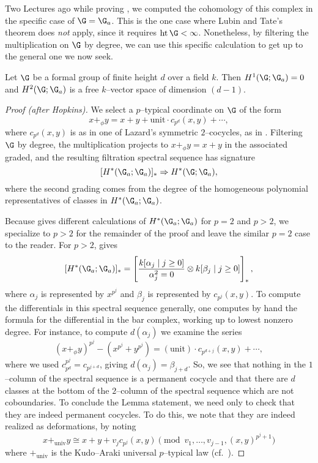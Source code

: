 Two Lectures ago while proving , we computed the cohomology of this complex in the specific case of $\G = \G_a$.  This is the one case where Lubin and Tate's theorem does \emph{not} apply, since it requires $\height \G < \infty$.  Nonetheless, by filtering the multiplication on $\G$ by degree, we can use this specific calculation to get up to the general one we now seek.

\begin{lemma}\label{CalculationOfLTTangentSpace}
Let $\G$ be a formal group of finite height $d$ over a field $k$.  Then $H^1(\G; \G_a) = 0$ and $H^2(\G; \G_a)$ is a free $k$--vector space of dimension $(d - 1)$.
\end{lemma}
\begin{proof}[Proof (after Hopkins)]
We select a $p$--typical coordinate on $\G$ of the form \[x +_\phi y = x + y + \mathrm{unit} \cdot c_{p^d}(x, y) + \cdots,\] where $c_{p^d}(x, y)$ is as in one of Lazard's symmetric $2$--cocycles, as in .  Filtering $\G$ by degree, the multiplication projects to $x +_\phi y = x + y$ in the associated graded, and the resulting filtration spectral sequence has signature \[[H^*(\G_a; \G_a)]_* \Rightarrow H^*(\G; \G_a),\] where the second grading comes from the degree of the homogeneous polynomial representatives of classes in $H^*(\G_a; \G_a)$.

Because  gives different calculations of $H^*(\G_a; \G_a)$ for $p = 2$ and $p > 2$, we specialize to $p > 2$ for the remainder of the proof and leave the similar $p = 2$ case to the reader.  For $p > 2$,  gives \[[H^*(\G_a; \G_a)]_* = \left[\frac{k[\alpha_j \mid j \ge 0]}{\alpha_j^2 = 0} \otimes k[\beta_j \mid j \ge 0]\right]_*,\] where $\alpha_j$ is represented by $x^{p^j}$ and $\beta_j$ is represented by $c_{p^j}(x, y)$.  To compute the differentials in this spectral sequence generally, one computes by hand the formula for the differential in the bar complex, working up to lowest nonzero degree.  For instance, to compute $d(\alpha_j)$ we examine the series \[(x +_\phi y)^{p^j} - (x^{p^j} + y^{p^j}) = (\text{unit}) \cdot c_{p^{d + j}}(x, y) + \cdots,\] where we used $c_{p^d}^{p^j} = c_{p^{j+d}}$, giving $d(\alpha_j) = \beta_{j+d}$.  So, we see that nothing in the $1$--column of the spectral sequence is a permanent cocycle and that there are $d$ classes at the bottom of the $2$--column of the spectral sequence which are not coboundaries.  To conclude the Lemma statement, we need only to check that they are indeed permanent cocycles.  To do this, we note that they are indeed realized as deformations, by noting \[x +_{\mathrm{univ}} y \cong x + y + v_j c_{p^j}(x, y) \pmod{v_1, \ldots, v_{j-1}, (x, y)^{p^j+1}}\] where $+_{\mathrm{univ}}$ is the Kudo--Araki universal $p$--typical law (cf.\ \cite[Proposition 1.1]{LubinTate}).
\end{proof}

